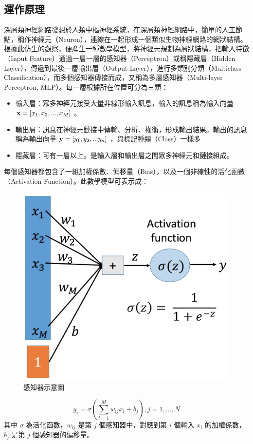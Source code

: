 \subsection{運作原理}
深層類神經網路發想於人類中樞神經系統，在深層類神經網路中，簡單的人工節點，稱作神經元（Neuron），連線在一起形成一個類似生物神經網路的網狀結構。根據此仿生的觀察，便產生一種數學模型，將神經元規劃為層狀結構，把輸入特徵（Input Feature）通過一層一層的感知器（Perceptron）或稱隱藏層（Hidden Layer），傳遞到最後一層輸出層（Output Layer），進行多類別分類（Multiclass Classification），而多個感知器傳接而成，又稱為多層感知器（Multi-layer Perceptron, MLP）。每一層根據所在位置可分為三類：
\begin{itemize}
    \item 輸入層：眾多神經元接受大量非線形輸入訊息，輸入的訊息稱為輸入向量 $\bold{x} = [x_1,x_2, ... , x_M]$ 。
    \item 輸出層：訊息在神經元鏈接中傳輸、分析、權衡，形成輸出結果。輸出的訊息稱為輸出向量 $\bold{y} = [y_1,y_2,...y_n]$ ，與標記種類（Class）一樣多
    \item 隱藏層：可有一層以上。是輸入層和輸出層之間眾多神經元和鏈接組成。
\end{itemize}
每個感知器都包含了一組加權係數、偏移量（Bias），以及一個非線性的活化函數（Activation Function）。此數學模型可表示成：
\begin{figure}[h]
    \centering
    \includegraphics[scale=0.4]{images/chap2_perceptron.png}
    \caption{感知器示意圖}
\end{figure}
\begin{equation}
    y_i = \sigma{(\sum_{i=1}^M w_{ij}x_i+b_j)} ,  j= 1,...,N
\end{equation}
其中 $\sigma$ 為活化函數，$w_{ij}$ 是第 $j$ 個感知器中，對應到第 $i$ 個輸入 $x_i$ 的加權係數，$b_j$ 是第 $j$ 個感知器的偏移量。


